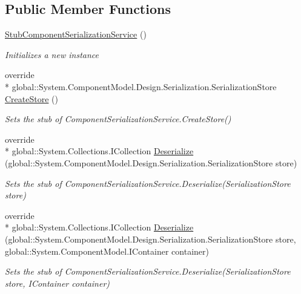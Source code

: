 \subsection*{Public Member Functions}
\begin{DoxyCompactItemize}
\item 
\hyperlink{class_system_1_1_component_model_1_1_design_1_1_serialization_1_1_fakes_1_1_stub_component_serialization_service_a6ebc3af1697c6ddfb798ff36c582a7b4}{Stub\-Component\-Serialization\-Service} ()
\begin{DoxyCompactList}\small\item\em Initializes a new instance\end{DoxyCompactList}\item 
override \\*
global\-::\-System.\-Component\-Model.\-Design.\-Serialization.\-Serialization\-Store \hyperlink{class_system_1_1_component_model_1_1_design_1_1_serialization_1_1_fakes_1_1_stub_component_serialization_service_aa1b95f3e12ccab03582617e993cf69bd}{Create\-Store} ()
\begin{DoxyCompactList}\small\item\em Sets the stub of Component\-Serialization\-Service.\-Create\-Store()\end{DoxyCompactList}\item 
override \\*
global\-::\-System.\-Collections.\-I\-Collection \hyperlink{class_system_1_1_component_model_1_1_design_1_1_serialization_1_1_fakes_1_1_stub_component_serialization_service_ae07b5e61af0e3b79d21d1c91f5724770}{Deserialize} (global\-::\-System.\-Component\-Model.\-Design.\-Serialization.\-Serialization\-Store store)
\begin{DoxyCompactList}\small\item\em Sets the stub of Component\-Serialization\-Service.\-Deserialize(\-Serialization\-Store store)\end{DoxyCompactList}\item 
override \\*
global\-::\-System.\-Collections.\-I\-Collection \hyperlink{class_system_1_1_component_model_1_1_design_1_1_serialization_1_1_fakes_1_1_stub_component_serialization_service_af2dc7d900988176c155776a2d8eb4429}{Deserialize} (global\-::\-System.\-Component\-Model.\-Design.\-Serialization.\-Serialization\-Store store, global\-::\-System.\-Component\-Model.\-I\-Container container)
\begin{DoxyCompactList}\small\item\em Sets the stub of Component\-Serialization\-Service.\-Deserialize(\-Serialization\-Store store, I\-Container container)\end{DoxyCompactList}\item 

\end{DoxyCompactItemize}
